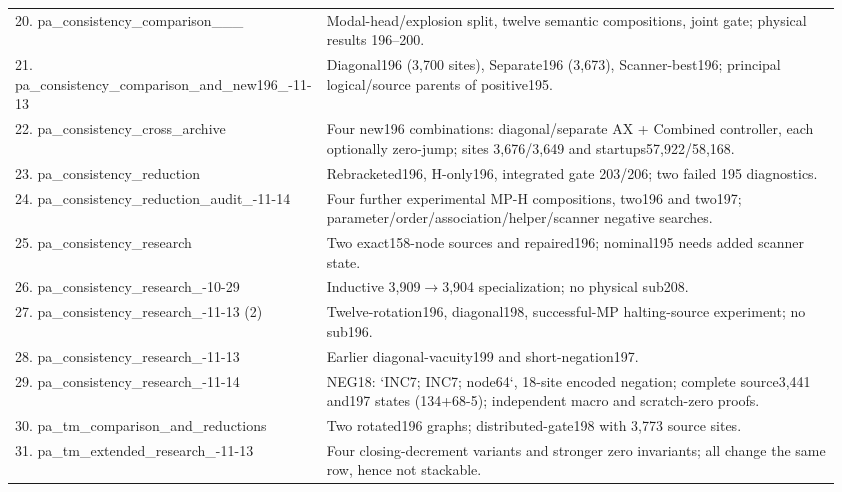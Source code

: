 \begin{longtable}{@{}p{0.34\linewidth}p{0.62\linewidth}@{}}
20. pa\_\allowbreak consistency\_\allowbreak comparison\_\allowbreak 2026\_\allowbreak 11\_\allowbreak 13 & Modal-head/explosion split, twelve semantic compositions, joint gate; physical results 196–200.\\[5pt]
21. pa\_\allowbreak consistency\_\allowbreak comparison\_\allowbreak and\_\allowbreak new196\_\allowbreak 2026-11-13 & Diagonal196 (3,700 sites), Separate196 (3,673), Scanner-best196; principal logical/source parents of positive195.\\[5pt]
22. pa\_\allowbreak consistency\_\allowbreak cross\_\allowbreak archive & Four new196 combinations: diagonal/separate AX + Combined controller, each optionally zero-jump; sites 3,676/3,649 and startups57,922/58,168.\\[5pt]
23. pa\_\allowbreak consistency\_\allowbreak reduction & Rebracketed196, H-only196, integrated gate 203/206; two failed 195 diagnostics.\\[5pt]
24. pa\_\allowbreak consistency\_\allowbreak reduction\_\allowbreak audit\_\allowbreak 2026-11-14 & Four further experimental MP-H compositions, two196 and two197; parameter/order/association/helper/scanner negative searches.\\[5pt]
25. pa\_\allowbreak consistency\_\allowbreak research & Two exact158-node sources and repaired196; nominal195 needs added scanner state.\\[5pt]
26. pa\_\allowbreak consistency\_\allowbreak research\_\allowbreak 2026-10-29 & Inductive 3,909$\to$3,904 specialization; no physical sub208.\\[5pt]
27. pa\_\allowbreak consistency\_\allowbreak research\_\allowbreak 2026-11-13 (2) & Twelve-rotation196, diagonal198, successful-MP halting-source experiment; no sub196.\\[5pt]
28. pa\_\allowbreak consistency\_\allowbreak research\_\allowbreak 2026-11-13 & Earlier diagonal-vacuity199 and short-negation197.\\[5pt]
29. pa\_\allowbreak consistency\_\allowbreak research\_\allowbreak 2026-11-14 & NEG18: `INC7; INC7; node64`, 18-site encoded negation; complete source3,441 and197 states (134+68-5); independent macro and scratch-zero proofs.\\[5pt]
30. pa\_\allowbreak tm\_\allowbreak comparison\_\allowbreak and\_\allowbreak reductions & Two rotated196 graphs; distributed-gate198 with 3,773 source sites.\\[5pt]
31. pa\_\allowbreak tm\_\allowbreak extended\_\allowbreak research\_\allowbreak 2026-11-13 & Four closing-decrement variants and stronger zero invariants; all change the same row, hence not stackable.\\[5pt]

\end{longtable}
